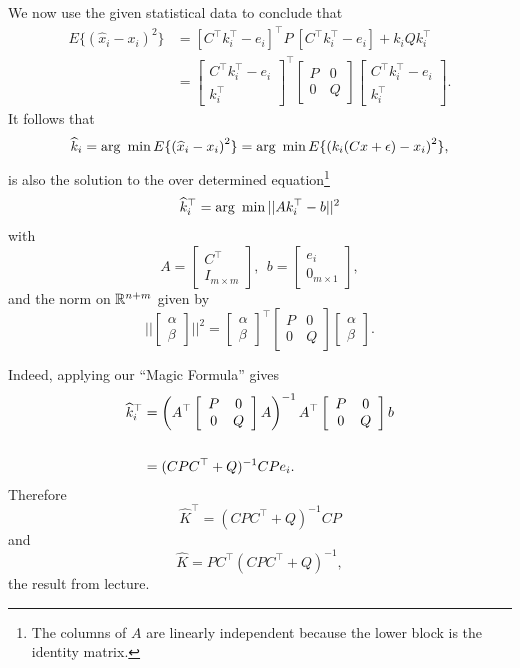 {We now use the given statistical data to conclude that
\begin{align*}
 E\{ \left( \widehat{x}_i - x_i \right)^2 \} &=   [C^\top k_i^\top-e_i]^\top P~ [C^\top k_i^\top-e_i] +  k_i Q k_i^\top \\
 &=\left[ \begin{array}{c} C^\top k_i^\top - e_i \\ k_i^\top\end{array} \right]^\top \left[ \begin{array}{cc}  P & 0  \\ 0& Q \end{array} \right] \left[ \begin{array}{c} C^\top k_i^\top - e_i \\ k_i^\top\end{array} \right].
\end{align*}
It follows that
$$\widehat{k}_i = {\rm arg}~\min  E\{ \left( \widehat{x}_i - x_i \right)^2 \} =\text{arg}~ \min E\{ \left( k_i (Cx+\epsilon)  - x_i \right)^2 \},$$
is also the solution to the over determined equation\footnote{The columns of $A$ are linearly independent because the lower block is the identity matrix.}
$$\widehat{k}_i^\top = {\rm arg}~\min ||A  k_i^\top - b||^2$$
with
$$A=\left[\begin{array}{c}  C^\top \\ I_{m\times m}\end{array} \right],~~b=\left[\begin{array}{c}  e_i \\ 0_{m\times 1}\end{array} \right],$$
and the norm on $\mathbb R^{n+m}$ given by $$||\left[ \begin{array}{c} \alpha \\ \beta\end{array} \right]||^2 = \left[ \begin{array}{c} \alpha \\ \beta\end{array} \right]^\top \left[ \begin{array}{cc}  P & 0  \\ 0& Q \end{array} \right] \left[ \begin{array}{c} \alpha \\ \beta\end{array} \right].$$

Indeed, applying our ``Magic Formula'' gives
 \begin{align*}
 \widehat{k}_i^\top &= \left( A^\top \left[ \begin{array}{cc}  P & 0  \\ 0& Q \end{array} \right]A \right)^{-1} A^\top  \left[ \begin{array}{cc}  P & 0  \\ 0& Q \end{array} \right] b \bigskip \\
 \\
 & = (CPC^\top + Q)^{-1} CPe_i.
 \end{align*}
Therefore
 $$ \widehat{K}^\top =  (CPC^\top + Q)^{-1} CP  $$
 and
  $$ \widehat{K} = PC^\top  (CPC^\top + Q)^{-1}, $$
  the result from lecture.


}
